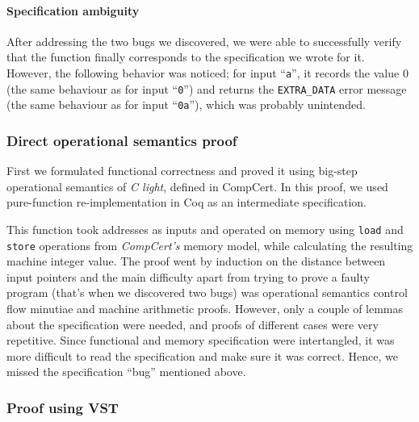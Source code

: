 \documentclass[10p,conference]{IEEEtran}
\begin{document}
\paragraph{Specification ambiguity}

After addressing the two bugs we discovered, we were able to
successfully verify that the function finally corresponds to the
specification we wrote for it. However, the following
behavior was noticed; for input ``\texttt{a}'', it records the value $0$ (the same behaviour
as for input ``\texttt{0}'') and returns the
\texttt{EXTRA\_DATA} error message (the same behaviour as for input
``\texttt{0a}''), which was probably unintended.
  
\subsubsection{Direct operational semantics proof}

First we formulated functional correctness and proved it using
big-step operational semantics of \textit{C light}, defined in
CompCert. In this proof, we used pure-function re-implementation in
Coq as an intermediate specification.

This function took addresses as inputs and operated on memory using
\texttt{load} and \texttt{store} operations from \textit{CompCert's}
memory model, while calculating the resulting machine integer
value. The proof went by induction on the distance between input
pointers and the main difficulty apart from trying to prove a faulty
program (that's when we discovered two bugs) was operational semantics
control flow minutiae and machine arithmetic proofs. However, only a
couple of lemmas about the specification were needed, and proofs of
different cases were very repetitive. Since functional and memory
specification were intertangled, it was more difficult to read the
specification and make sure it was correct. Hence, we missed the
specification ``bug'' mentioned above.

\subsubsection{Proof using VST}
\end{document}
